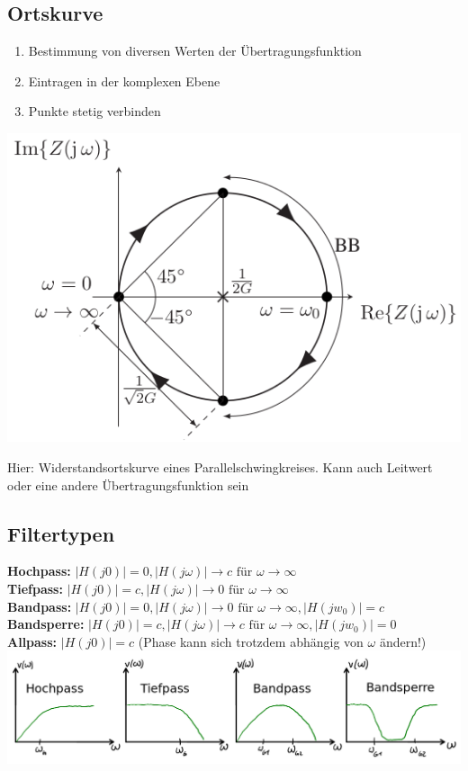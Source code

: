 \documentclass[fs, footer]{latex4ei}
\begin{document}
\begin{multicols*}{4}
    \subsection{Ortskurve}
    \begin{enumerate}
        \item Bestimmung von diversen Werten der Übertragungsfunktion
        \item Eintragen in der komplexen Ebene
        \item Punkte stetig verbinden
    \end{enumerate}
    \parbox{.6\linewidth}{
        \includegraphics[width=\linewidth]{img/ortskurve-r}}
    \parbox{.4\linewidth}{
        Hier: Widerstandsortskurve eines Parallelschwingkreises. Kann auch Leitwert oder eine andere Übertragungsfunktion sein}
    \subsection{Filtertypen}
    \textbf{Hochpass:} $|H(j0)| = 0, |H(j\omega)| \rightarrow c \text{ für } \omega \rightarrow \infty$\\
    \textbf{Tiefpass:} $|H(j0)| = c, |H(j\omega)| \rightarrow 0 \text{ für } \omega \rightarrow \infty$\\
    \textbf{Bandpass:} $|H(j0)| = 0, |H(j\omega)| \rightarrow 0 \text{ für } \omega \rightarrow \infty, |H(jw_0)| = c$\\
    \textbf{Bandsperre:} $|H(j0)| = c, |H(j\omega)| \rightarrow c \text{ für } \omega \rightarrow \infty, |H(jw_0)| = 0$\\
    \textbf{Allpass:} $|H(j0)| = c$ (Phase kann sich trotzdem abhängig von $\omega$ ändern!)\\
    \includegraphics[width=\linewidth]{img/filtertypen}

\end{multicols*}
\end{document}
